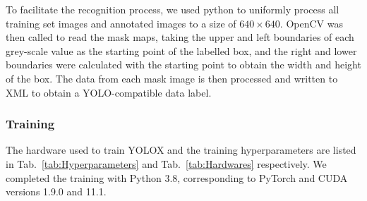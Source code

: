 To facilitate the recognition process, we used python to uniformly process all training set images and annotated images to a size of $640\times 640$. OpenCV was then called to read the mask maps, taking the upper and left boundaries of each grey-scale value as the starting point of the labelled box, and the right and lower boundaries were calculated with the starting point to obtain the width and height of the box. The data from each mask image is then processed and written to XML to obtain a YOLO-compatible data label. 




\subsubsection{Training}
The hardware used to train YOLOX and the training hyperparameters are listed in Tab.~\ref{tab:Hyperparameters} and Tab.~\ref{tab:Hardwares} respectively. We completed the training with Python 3.8, corresponding to PyTorch and CUDA versions 1.9.0 and 11.1.

\begin{table}[htb]
\centering
\caption{Hardwares and their parameters}
\label{tab:Hardwares}
\end{table}

\begin{table}[htb]
\centering
\caption{Hyperparameters for training}
\label{tab:Hyperparameters}
\end{table}

